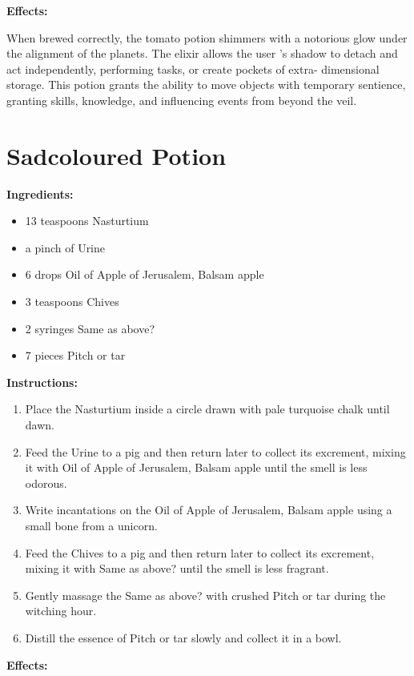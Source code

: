 \documentclass{article}
\begin{document}
\textbf{Effects:}

When brewed correctly, the tomato potion shimmers with a notorious glow under the alignment of the planets. The elixir allows the user 's shadow to detach and act independently, performing tasks, or create pockets of extra- dimensional storage. This potion grants the ability to move objects with temporary sentience, granting skills, knowledge, and influencing events from beyond the veil.

\newpage
\section*{Sadcoloured Potion}

\textbf{Ingredients:}

\begin{itemize}
  \item 13 teaspoons Nasturtium
  \item a pinch of Urine
  \item 6 drops Oil of Apple of Jerusalem, Balsam apple
  \item 3 teaspoons Chives
  \item 2 syringes Same as above?
  \item 7 pieces Pitch or tar
\end{itemize}

\textbf{Instructions:}

\begin{enumerate}
  \item Place the Nasturtium inside a circle drawn with pale turquoise chalk until dawn.
  \item Feed the Urine to a pig and then return later to collect its excrement, mixing it with Oil of Apple of Jerusalem, Balsam apple until the smell is less odorous.
  \item Write incantations on the Oil of Apple of Jerusalem, Balsam apple using a small bone from a unicorn.
  \item Feed the Chives to a pig and then return later to collect its excrement, mixing it with Same as above? until the smell is less fragrant.
  \item Gently massage the Same as above? with crushed Pitch or tar during the witching hour.
  \item Distill the essence of Pitch or tar slowly and collect it in a bowl.
\end{enumerate}

\textbf{Effects:}
\end{document}
